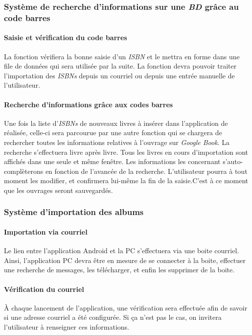 \subsubsection{Système de recherche d'informations sur une \emph{BD} grâce au code barres}

\paragraph{Saisie et vérification du code barres}
La fonction vérifiera la bonne saisie d'un \emph{ISBN} et le mettra en forme dans une file de données qui sera utilisée par la suite. 
La fonction devra pouvoir traiter l'importation des \emph{ISBNs} depuis un courriel ou depuis une entrée manuelle de l'utilisateur. 

\paragraph{Recherche d'informations grâce aux codes barres}
Une fois la liste d'\emph{ISBNs} de nouveaux livres à insérer dans l'application de réalisée, 
	 celle-ci sera parcourue par une autre fonction qui se chargera de rechercher toutes les informations relatives à l'ouvrage sur \emph{Google Book}. 
La recherche s'effectuera livre après livre. 
Tous les livres en cours d'importation sont affichés dans une seule et même fenêtre. 
Les informations les concernant s'auto-complèterons en fonction de l'avancée de la recherche.
L'utilisateur pourra à tout moment les modifier, et confirmera lui-même la fin de la saisie.C'est à ce moment que les ouvrages seront sauvegardés.

\subsubsection{Système d'importation des albums}

\paragraph{Importation via courriel} 
Le lien entre l'application Android et la PC s'effectuera via une boite courriel. 
Ainsi, l'application PC devra être en mesure de se connecter à la boite, effectuer une recherche de messages, 
	les télécharger, et enfin les supprimer de la boite. 

\paragraph{Vérification du courriel}
À chaque lancement de l'application, une vérification sera effectuée afin de savoir si une adresse courriel a été configurée. 
Si ça n'est pas le cas, on invitera l'utilisateur à renseigner ces informations. 

